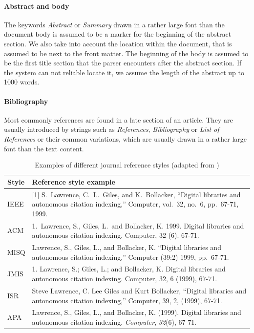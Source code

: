 \paragraph{Abstract and body} The keywords \emph{Abstract} or \emph{Summary} drawn in a rather large font than the document body is assumed to be a marker for the beginning of the abstract section. We also take into account the location within the document, that is assumed to be next to the front matter. The beginning of the body is assumed to be the first title section that the parser encounters after the abstract section. If the system can not reliable locate it, we assume the length of the abstract up to 1000 words.

\paragraph{Bibliography} Most commonly references are found in a late section of an article. They are usually introduced by strings such as \emph{References}, \emph{Bibliography} or \emph{List of References} or their common variations, which are usually drawn in a rather large font than the text content.

\begin{table}
 \centering
 \begin{tabular}{l p{120mm}}
 \toprule
  Style & Reference style example\\
 \midrule
 IEEE & [1] S.\ Lawrence, C.\ L.\ Giles, and K.\ Bollacker, ``Digital libraries and autonomous citation indexing,'' Computer, vol.\ 32, no.\ 6, pp.\ 67-71, 1999.\\
 ACM  & 1.\ Lawrence, S., Giles, L.\ and Bollacker, K. 1999. Digital libraries and autonomous citation indexing. Computer, 32 (6). 67-71.\\
 MISQ & Lawrence, S., Giles, L., and Bollacker, K. ``Digital libraries and autonomous citation indexing,'' Computer (39:2) 1999, pp.\ 67-71.\\
 JMIS & 1. Lawrence, S.; Giles, L.; and Bollacker, K. Digital libraries and autonomous citation indexing. Computer, 32, 6 (1999), 67-71.\\
 ISR  & Steve Lawrence, C. Lee Giles and Kurt Bollacker, ``Digital libraries and autonomous citation indexing,'' Computer, 39, 2, (1999), 67-71.\\
 APA  & Lawrence, S., Giles, L., and Bollacker, K. (1999). Digital libraries and autonomous citation indexing. \emph{Computer}, \emph{32}(6), 67-71.\\
 \bottomrule
 \end{tabular}
 \caption{Examples of different journal reference styles (adapted from \cite{day2007})}
 \label{tab:citation_styles}
\end{table}


